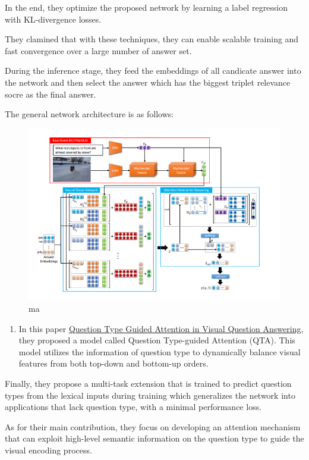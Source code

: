 \documentclass[]{book}
\providecommand{\tightlist}{%
  \setlength{\itemsep}{0pt}\setlength{\parskip}{0pt}}
\theoremstyle{definition}
\theoremstyle{definition}
\theoremstyle{definition}
\theoremstyle{remark}
\begin{document}
In the end, they optimize the proposed network by learning a label
regression with KL-divergence losses.

They clamined that with these techniques, they can enable scalable
training and fast convergence over a large number of answer set.

During the inference stage, they feed the embeddings of all candicate
answer into the network and then select the answer which has the biggest
triplet relevance socre as the final answer.

The general network architecture is as follows:

\begin{figure}
\centering
\includegraphics{img/vqa.png}
\caption{ma}
\end{figure}

\begin{enumerate}
\def\labelenumi{\arabic{enumi}.}
\setcounter{enumi}{1}
\tightlist
\item
  In this paper \href{https://arxiv.org/pdf/1804.02088.pdf}{Question
  Type Guided Attention in Visual Question Answering}, they proposed a
  model called Question Type-guided Attention (QTA). This model utilizes
  the information of question type to dynamically balance visual
  features from both top-down and bottom-up orders.
\end{enumerate}

Finally, they propose a multi-task extension that is trained to predict
question types from the lexical inputs during training which generalizes
the network into applications that lack question type, with a minimal
performance loss.

As for their main contribution, they focus on developing an attention
mechanism that can exploit high-level semantic information on the
question type to guide the visual encoding process.
\end{document}
